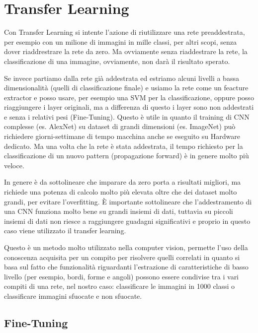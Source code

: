 \chapter{Transfer Learning}\label{transfer-learning}

Con Transfer Learning si intente l'azione di riutilizzare una rete preaddestrata, per esempio con un milione di immagini in mille classi, per altri scopi, senza dover riaddrestrare la rete da zero. Ma ovviamente senza riaddestrare la rete, la classificazione di una immagine, ovviamente, non darà il risultato sperato.  

Se invece partiamo dalla rete già addestrata ed estriamo alcuni livelli a bassa dimensionalità (quelli di classificazione finale) e usiamo la rete come un feacture extractor  e posso usare, per esempio una SVM per la classificazione, oppure posso riaggiungere i layer originali, ma a differenza di questo i layer sono non addestrati e senza i relativi pesi (Fine-Tuning). Questo è utile in quanto il training di CNN complesse (es. AlexNet) su dataset di grandi dimensioni (es. ImageNet) può richiedere giorni-settimane di tempo macchina anche se eseguito su Hardware dedicato. Ma una volta che la rete è stata addestrata, il tempo richiesto per la classificazione di un nuovo pattern (propagazione forward) è in genere molto più veloce\cite{yosinski_tl}\cite{unibo_maltoni_ml}.

In genere è da sottolineare che imparare da zero porta a risultati migliori, ma richiede una potenza di calcolo molto più  elevata oltre che dei dataset molto grandi, per evitare l'\gls{overfitting}. È importante sottolineare che l'addestramento di una CNN funziona molto bene su grandi insiemi di dati, tuttavia su piccoli insiemi di dati non riesce a raggiungere guadagni significativi e proprio in questo caso viene utilizzato il transfer learning\cite{joel_tl}.

Questo è un metodo molto utilizzato nella computer vision, permette l'uso della conoscenza acquisita per un
compito per risolvere quelli correlati in quanto si basa sul fatto che
funzionalità riguardanti l'estrazione di caratteristiche di basso livello
(per esempio, bordi, forme e angoli) possono essere condivise tra i vari compiti di una rete, nel nostro caso: classificare le immagini in 1000 classi o classificare immagini sfuocate e non sfuocate\cite{patrini_tl}.




\section{Fine-Tuning}\label{fine-tuning}

